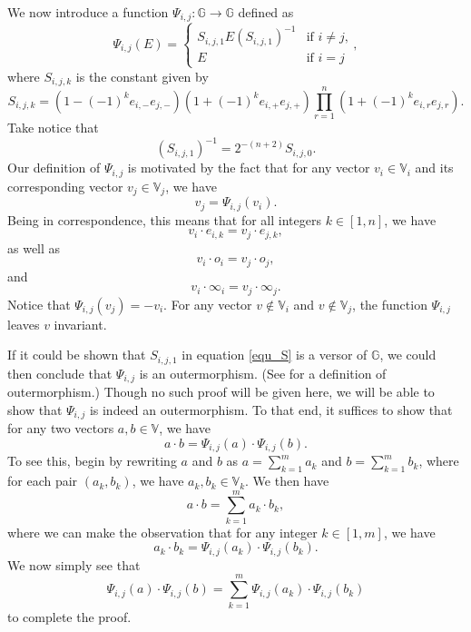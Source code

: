 \documentclass{ecgd-l}
\theoremstyle{definition}
\theoremstyle{remark}
\numberwithin{equation}{section}
\newcommand{\G}{\mathbb{G}}
\newcommand{\V}{\mathbb{V}}
\newcommand{\nvai}{\infty}
\newcommand{\nvao}{o}
\begin{document}
We now introduce a function $\Psi_{i,j}:\G\to\G$ defined as
\begin{equation*}
\Psi_{i,j}(E) = \left\{\begin{array}{ll}
S_{i,j,1}E(S_{i,j,1})^{-1} & \mbox{if $i\neq j$,} \\
E & \mbox{if $i=j$}\end{array}\right.,
\end{equation*}
where $S_{i,j,k}$ is the constant given by
\begin{equation}\label{equ_S}
S_{i,j,k} = \left(1-(-1)^ke_{i,-}e_{j,-}\right)\left(1+(-1)^ke_{i,+}e_{j,+}\right)\prod_{r=1}^n\left(1+(-1)^ke_{i,r}e_{j,r}\right).
\end{equation}
Take notice that
\begin{equation*}
(S_{i,j,1})^{-1} = 2^{-(n+2)}S_{i,j,0}.
\end{equation*}
Our definition of $\Psi_{i,j}$ is motivated by the fact that for any vector $v_i\in\V_i$ and its
corresponding vector $v_j\in\V_j$, we have
\begin{equation*}
v_j = \Psi_{i,j}(v_i).
\end{equation*}
Being in correspondence, this means that for all integers $k\in[1,n]$,
we have
\begin{equation*}
v_i\cdot e_{i,k}=v_j\cdot e_{j,k},
\end{equation*}
as well as
\begin{equation*}
v_i\cdot\nvao_i = v_j\cdot\nvao_j,
\end{equation*}
and
\begin{equation*}
v_i\cdot\nvai_i = v_j\cdot\nvai_j.
\end{equation*}
Notice that $\Psi_{i,j}(v_j)=-v_i$.
For any vector $v\not\in\V_i$ and $v\not\in\V_j$, the function $\Psi_{i,j}$ leaves $v$ invariant.

If it could be shown that $S_{i,j,1}$ in equation \eqref{equ_S} is a versor of $\G$,
we could then conclude that $\Psi_{i,j}$ is an outermorphism.
(See \cite{Hestenes91} for a definition of outermorphism.)  Though no such
proof will be given here, we will be able to show that $\Psi_{i,j}$ is indeed
an outermorphism.  To that end, it suffices to show that
for any two vectors $a,b\in\V$, we have
\begin{equation}\label{equ_inner_prod_add_psi}
a\cdot b = \Psi_{i,j}(a)\cdot \Psi_{i,j}(b).
\end{equation}
To see this, begin by rewriting $a$ and $b$ as
$a = \sum_{k=1}^m a_k$ and $b = \sum_{k=1}^m b_k$,
where for each pair $(a_k,b_k)$, we have $a_k,b_k\in\V_k$.  We then have
\begin{equation*}
a\cdot b=\sum_{k=1}^m a_k\cdot b_k,
\end{equation*}
where we can make the observation that for any integer $k\in[1,m]$, we have
\begin{equation*}
a_k\cdot b_k = \Psi_{i,j}(a_k)\cdot\Psi_{i,j}(b_k).
\end{equation*}
We now simply see that
\begin{equation*}
\Psi_{i,j}(a)\cdot\Psi_{i,j}(b)=\sum_{k=1}^m\Psi_{i,j}(a_k)\cdot\Psi_{i,j}(b_k)
\end{equation*}
to complete the proof.
\end{document}
